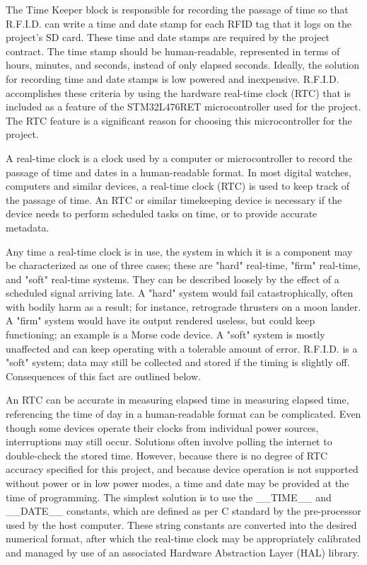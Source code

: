 The Time Keeper block is responsible for recording the passage of time so that R.F.I.D. can write a time and date stamp for each RFID tag that it logs on the project's SD card. These time and date stamps are required by the project contract. The time stamp should be human-readable, represented in terms of hours, minutes, and seconds, instead of only elapsed seconds. Ideally, the solution for recording time and date stamps is low powered and inexpensive. R.F.I.D. accomplishes these criteria by using the hardware real-time clock (RTC) that is included as a feature of the STM32L476RET microcontroller used for the project. The RTC feature is a significant reason for choosing this microcontroller for the project. 

A real-time clock is a clock used by a computer or microcontroller to record the passage of time and dates in a human-readable format. In most digital watches, computers and similar devices, a real-time clock (RTC) is used to keep track of the passage of time. An RTC or similar timekeeping device is necessary if the device needs to perform scheduled tasks on time, or to provide accurate metadata.

Any time a real-time clock is in use, the system in which it is a component may be characterized as one of three cases; these are "hard" real-time, "firm" real-time, and "soft" real-time systems. They can be described loosely by the effect of a scheduled signal arriving late. A "hard" system would fail catastrophically, often with bodily harm as a result; for instance, retrograde thrusters on a moon lander. A "firm" system would have its output rendered useless, but could keep functioning; an example is a Morse code device. A "soft" system is mostly unaffected and can keep operating with a tolerable amount of error. R.F.I.D. is a "soft" system; data may still be collected and stored if the timing is slightly off. Consequences of this fact are outlined below.
\par


An RTC can be accurate in measuring elapsed time in measuring elapsed time\DIFaddbegin {}\DIFaddend , referencing the time of day in a human-readable format can be complicated. Even though some devices operate their clocks from individual power sources, interruptions may still occur. Solutions often involve polling the internet to double-check the stored time. However, because there is no degree of RTC accuracy specified for this project, and because device operation is not supported without power or in low power modes, a time and date may be provided at the time of programming. The simplest solution is to use the \_\_TIME\_\_ and \_\_DATE\_\_ constants, which are defined as per C standard by the pre-processor used by the host computer. These string constants are converted into the desired numerical format, after which the real-time clock may be appropriately calibrated and managed by use of an associated Hardware Abstraction Layer (HAL) library.
\par
\DIFdelbegin %

